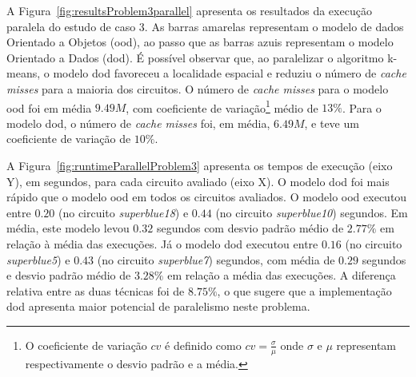 A Figura~\ref{fig:resultsProblem3parallel} apresenta os resultados da execução paralela do estudo de caso 3.
As barras amarelas representam o modelo de dados Orientado a Objetos (\ac{ood}), ao passo que as barras azuis representam o modelo Orientado a Dados (\ac{dod}).
É possível observar que, ao paralelizar o algoritmo k-means, o modelo \ac{dod} favoreceu a localidade espacial e reduziu o número de  \textit{cache misses} para a maioria dos circuitos.
O número de  \textit{cache misses} para o modelo \ac{ood} foi em média $9.49M$, com coeficiente de variação\footnote{O coeficiente de variação $cv$ é definido como $cv = \frac{\sigma}{\mu}$ onde $\sigma$ e $\mu$ representam respectivamente o desvio padrão e a média.} médio de $13\%$.
Para o modelo \ac{dod}, o número de  \textit{cache misses} foi, em média, $6.49M$, e teve um coeficiente de variação de $10\%$.





A Figura~\ref{fig:runtimeParallelProblem3} apresenta os tempos de execução (eixo Y), em segundos, para cada circuito avaliado (eixo X).
O modelo \ac{dod} foi mais rápido que o modelo \ac{ood} em todos os circuitos avaliados.
O modelo \ac{ood} executou entre $0.20$ (no circuito \textit{superblue18}) e $0.44$ (no circuito \textit{superblue10}) segundos. Em média, este modelo levou $0.32$ segundos com desvio padrão médio de $2.77\%$ em relação à média das execuções. 
Já o modelo \ac{dod} executou entre $0.16$ (no circuito \textit{superblue5}) e $0.43$ (no circuito \textit{superblue7}) segundos, com média de $0.29$ segundos e desvio padrão médio de $3.28\%$ em relação a média das execuções.
A diferença relativa entre as duas técnicas foi de $8.75\%$, o que sugere que a implementação \ac{dod} apresenta maior potencial de paralelismo neste problema.




